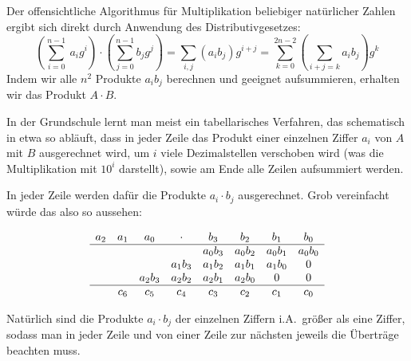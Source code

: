 \begin{remark}
    Der offensichtliche Algorithmus für Multiplikation beliebiger natürlicher Zahlen ergibt sich direkt durch Anwendung des Distributivgesetzes:
    \[\left(\sum_{i=0}^{n-1}\ a_i g^i \right)\cdot\left(\sum_{j=0}^{n-1} b_j g^j\right) = \sum_{i,j} (a_i b_j) g^{i+j} = \sum_{k=0}^{2n-2} \left(\sum_{i+j=k}a_i b_j\right)g^k\]
    Indem wir alle $n^2$ Produkte $a_i b_j$ berechnen und geeignet aufsummieren, erhalten wir das Produkt $A\cdot B$.

    \medskip
    In der Grundschule lernt man meist ein tabellarisches Verfahren, das schematisch in etwa so abläuft, dass in jeder Zeile das Produkt einer einzelnen Ziffer $a_i$ von $A$ mit $B$ ausgerechnet wird, um $i$ viele Dezimalstellen verschoben wird (was die Multiplikation mit $10^i$ darstellt), sowie am Ende alle Zeilen aufsummiert werden.

    \smallskip
    In jeder Zeile werden dafür die Produkte $a_i\cdot b_j$ ausgerechnet. Grob vereinfacht würde das also so aussehen:

    \[\begin{array}{c c c c c c c c}
          a_2 & a_1 & a_0     & \cdot   & b_3     & b_2     & b_1     & b_0     \\
          \hline
          &     &         &         & a_0 b_3 & a_0 b_2 & a_0 b_1 & a_0 b_0 \\
          &     &         & a_1 b_3 & a_1 b_2 & a_1 b_1 & a_1 b_0 & 0       \\
          &     & a_2 b_3 & a_2 b_2 & a_2 b_1 & a_2 b_0 & 0       & 0       \\
          \hline
          & c_6 & c_5     & c_4     & c_3     & c_2     & c_1     & c_0
    \end{array}\]

    Natürlich sind die Produkte $a_i\cdot b_j$ der einzelnen Ziffern i.A.\ größer als eine Ziffer, sodass man in jeder Zeile und von einer Zeile zur nächsten jeweils die Überträge beachten muss.
\end{remark}

